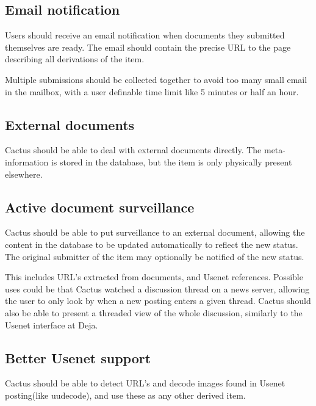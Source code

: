 \subsection*{Email notification}

Users should receive an email notification when documents they
submitted themselves are ready.  The email should contain the precise
URL to the page describing all derivations of the item.

Multiple submissions should be collected together to avoid too many
small email in the mailbox, with a user definable time limit like 5
minutes or half an hour.


\subsection*{External documents}

Cactus should be able to deal with external documents directly.  The
meta-information is stored in the database, but the item is only
physically present elsewhere.

\subsection*{Active document surveillance}

Cactus should be able to put surveillance to an external document,
allowing the content in the database to be updated automatically to
reflect the new status.  The original submitter of the item may
optionally be notified of the new status.

This includes URL's extracted from documents, and Usenet references.
Possible uses could be that Cactus watched a discussion thread on a
news server, allowing the user to only look by when a new posting
enters a given thread.   Cactus should also be able to present a
threaded view of the whole discussion, similarly to the Usenet
interface at Deja.

\subsection*{Better Usenet support}

Cactus should be able to detect URL's and decode images found in
Usenet posting(like uudecode), and use these as any other derived
item.


